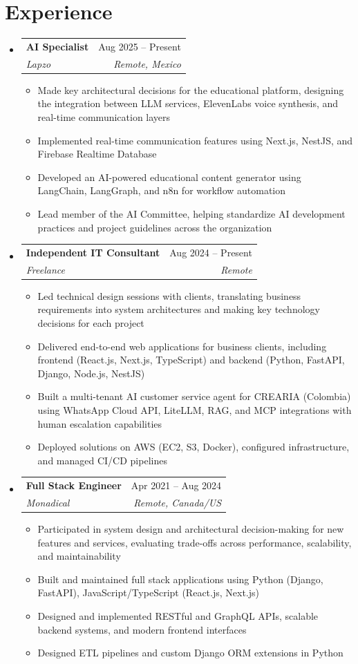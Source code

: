\documentclass[letterpaper,11pt]{article}
\makeatletter
\newcommand{\resumeSubheading}[4]{
  \vspace{-2pt}
  \item[]
  \begin{tabular*}{\textwidth}{@{\extracolsep{\fill}}l r}
    \textbf{#1} & #2 \\
    \textit{#3} & \textit{#4} \\
  \end{tabular*}
  \vspace{-5pt}
}
\makeatother
\begin{document}
\section{Experience}
\begin{itemize}[leftmargin=0pt, itemindent=0pt, label={}, itemsep=1pt]
\resumeSubheading
{AI Specialist}{Aug 2025 -- Present}
{Lapzo}{Remote, Mexico}
\begin{itemize}[leftmargin=*, itemsep=0pt]
    \item Made key architectural decisions for the educational platform, designing the integration between LLM services, ElevenLabs voice synthesis, and real-time communication layers
    \item Implemented real-time communication features using Next.js, NestJS, and Firebase Realtime Database
    \item Developed an AI-powered educational content generator using LangChain, LangGraph, and n8n for workflow automation
    \item Lead member of the AI Committee, helping standardize AI development practices and project guidelines across the organization
\end{itemize}

\resumeSubheading
{Independent IT Consultant}{Aug 2024 -- Present}
{Freelance}{Remote}
\begin{itemize}[leftmargin=*, itemsep=0pt]
    \item Led technical design sessions with clients, translating business requirements into system architectures and making key technology decisions for each project
    \item Delivered end-to-end web applications for business clients, including frontend (React.js, Next.js, TypeScript) and backend (Python, FastAPI, Django, Node.js, NestJS)
    \item Built a multi-tenant AI customer service agent for CREARIA (Colombia) using WhatsApp Cloud API, LiteLLM, RAG, and MCP integrations with human escalation capabilities
    \item Deployed solutions on AWS (EC2, S3, Docker), configured infrastructure, and managed CI/CD pipelines
\end{itemize}

\resumeSubheading
{Full Stack Engineer}{Apr 2021 -- Aug 2024}
{Monadical}{Remote, Canada/US}
\begin{itemize}[leftmargin=*, itemsep=0pt]
    \item Participated in system design and architectural decision-making for new features and services, evaluating trade-offs across performance, scalability, and maintainability
    \item Built and maintained full stack applications using Python (Django, FastAPI), JavaScript/TypeScript (React.js, Next.js)
    \item Designed and implemented RESTful and GraphQL APIs, scalable backend systems, and modern frontend interfaces
    \item Designed ETL pipelines and custom Django ORM extensions in Python
\end{itemize}


\end{itemize}
\end{document}
